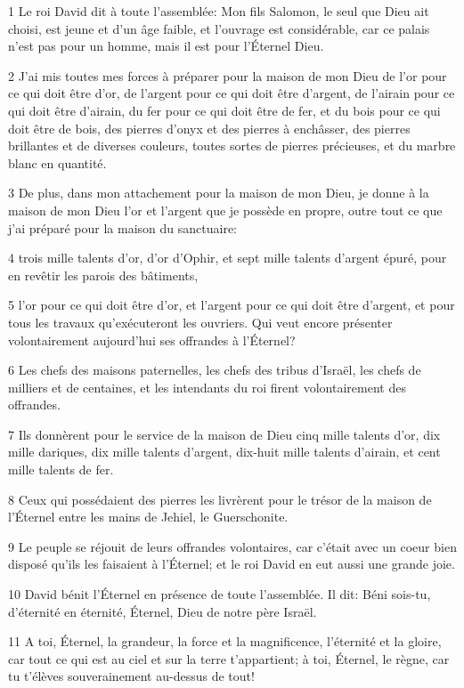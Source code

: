 \par 1 Le roi David dit à toute l'assemblée: Mon fils Salomon, le seul que Dieu ait choisi, est jeune et d'un âge faible, et l'ouvrage est considérable, car ce palais n'est pas pour un homme, mais il est pour l'Éternel Dieu.
\par 2 J'ai mis toutes mes forces à préparer pour la maison de mon Dieu de l'or pour ce qui doit être d'or, de l'argent pour ce qui doit être d'argent, de l'airain pour ce qui doit être d'airain, du fer pour ce qui doit être de fer, et du bois pour ce qui doit être de bois, des pierres d'onyx et des pierres à enchâsser, des pierres brillantes et de diverses couleurs, toutes sortes de pierres précieuses, et du marbre blanc en quantité.
\par 3 De plus, dans mon attachement pour la maison de mon Dieu, je donne à la maison de mon Dieu l'or et l'argent que je possède en propre, outre tout ce que j'ai préparé pour la maison du sanctuaire:
\par 4 trois mille talents d'or, d'or d'Ophir, et sept mille talents d'argent épuré, pour en revêtir les parois des bâtiments,
\par 5 l'or pour ce qui doit être d'or, et l'argent pour ce qui doit être d'argent, et pour tous les travaux qu'exécuteront les ouvriers. Qui veut encore présenter volontairement aujourd'hui ses offrandes à l'Éternel?
\par 6 Les chefs des maisons paternelles, les chefs des tribus d'Israël, les chefs de milliers et de centaines, et les intendants du roi firent volontairement des offrandes.
\par 7 Ils donnèrent pour le service de la maison de Dieu cinq mille talents d'or, dix mille dariques, dix mille talents d'argent, dix-huit mille talents d'airain, et cent mille talents de fer.
\par 8 Ceux qui possédaient des pierres les livrèrent pour le trésor de la maison de l'Éternel entre les mains de Jehiel, le Guerschonite.
\par 9 Le peuple se réjouit de leurs offrandes volontaires, car c'était avec un coeur bien disposé qu'ils les faisaient à l'Éternel; et le roi David en eut aussi une grande joie.
\par 10 David bénit l'Éternel en présence de toute l'assemblée. Il dit: Béni sois-tu, d'éternité en éternité, Éternel, Dieu de notre père Israël.
\par 11 A toi, Éternel, la grandeur, la force et la magnificence, l'éternité et la gloire, car tout ce qui est au ciel et sur la terre t'appartient; à toi, Éternel, le règne, car tu t'élèves souverainement au-dessus de tout!
